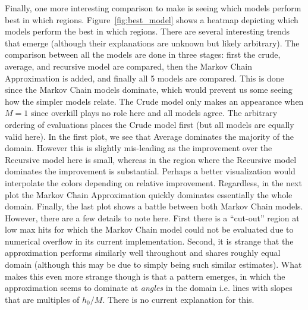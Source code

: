			Finally, one more interesting comparison to make is seeing which models perform best in which regions. Figure~\ref{fig:best_model} shows a heatmap depicting which models perform the best in which regions. There are several interesting trends that emerge (although their explanations are unknown but likely arbitrary). The comparison between all the models are done in three stages: first the crude, average, and recursive model are compared, then the Markov Chain Approximation is added, and finally all 5 models are compared. This is done since the Markov Chain models dominate, which would prevent us some seeing how the simpler models relate. The Crude model only makes an appearance when $M=1$ since overkill plays no role here and all models agree. The arbitrary ordering of evaluations places the Crude model first (but all models are equally valid here). In the first plot, we see that Average dominates the majority of the domain. However this is slightly mis-leading as the improvement over the Recursive model here is small, whereas in the region where the Recursive model dominates the improvement is substantial. Perhaps a better visualization would interpolate the colors depending on relative improvement. Regardless, in the next plot the Markov Chain Approximation quickly dominates essentially the whole domain. Finally, the last plot shows a battle between both Markov Chain models. However, there are a few details to note here. First there is a ``cut-out'' region at low max hits for which the Markov Chain model could not be evaluated due to numerical overflow in its current implementation. Second, it is strange that the approximation performs similarly well throughout and shares roughly equal domain (although this may be due to simply being such similar estimates). What makes this even more strange though is that a pattern emerges, in which the approximation seems to dominate at \textit{angles} in the domain i.e. lines with slopes that are multiples of $h_0/M$. There is no current explanation for this.

